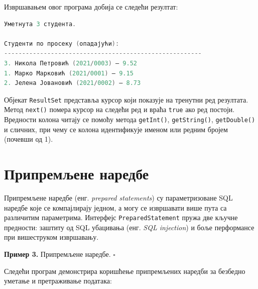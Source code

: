 Извршавањем овог програма добија се следећи резултат:


\begin{lstlisting}[language=Java]
Уметнута 3 студента.
 
Студенти по просеку (опадајући):
-------------------------------------------------------
3. Никола Петровић (2021/0003) – 9.52
1. Марко Марковић (2021/0001) – 9.15
2. Јелена Јовановић (2021/0002) – 8.73
\end{lstlisting}


Објекат \texttt{ResultSet} представља курсор који показује на тренутни ред резултата. Метод \texttt{next()} помера курсор на следећи ред и враћа \texttt{true} ако ред постоји. Вредности колона читају се помоћу метода \texttt{getInt()}, \texttt{getString()}, \texttt{getDouble()} и сличних, при чему се колона идентификује именом или редним бројем (почевши од 1).


\section{Припремљене наредбе}

Припремљене наредбе (енг. \textit{prepared statements}) су параметризоване SQL наредбе које се компајлирају једном, а могу се извршавати више пута са различитим параметрима. Интерфејс \texttt{PreparedStatement} пружа две кључне предности: заштиту од SQL убацивања (енг. \textit{SQL injection}) и боље перформансе при вишеструком извршавању.


\bigskip

\noindent \textbf{Пример 3.} Припремљене наредбе. $\square$

\medskip

Следећи програм демонстрира коришћење припремљених наредби за безбедно уметање и претраживање података:


